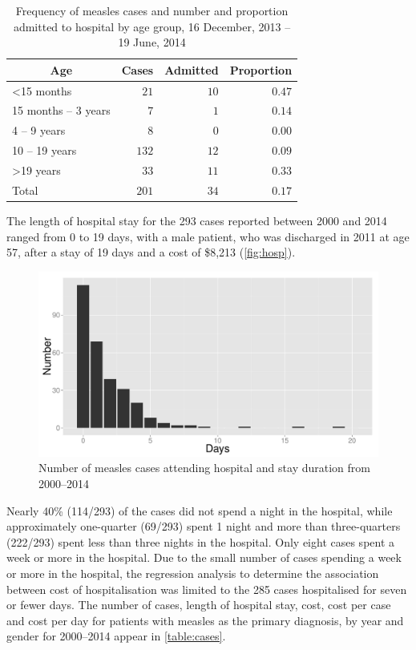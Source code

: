\documentclass{article}
\begin{document}
\begin{table}
\caption{Frequency of measles cases and number and proportion admitted to hospital by age group, 16 December, 2013 -- 19 June, 2014}
\begin{center}
\begin{tabular}{lrrr}
\hline\hline
\multicolumn{1}{c}{Age}&\multicolumn{1}{c}{Cases}&\multicolumn{1}{c}{Admitted}&\multicolumn{1}{c}{Proportion}\tabularnewline
\hline
\textless  15 months&$ 21$&$10$&$0.47$\tabularnewline
15 months – 3 years&$  7$&$ 1$&$0.14$\tabularnewline
4 – 9 years&$  8$&$ 0$&$0.00$\tabularnewline
10 – 19 years&$132$&$12$&$0.09$\tabularnewline
\textgreater  19 years&$ 33$&$11$&$0.33$\tabularnewline
Total&$201$&$34$&$0.17$\tabularnewline
\hline
\end{tabular}\end{center}\label{table:freq}
\end{table}

The length of hospital stay for the 293 cases reported between 2000 and 2014 ranged from 0 to 19 days, with a male patient, who was discharged in 2011 at age 57, after a stay of 19 days and a cost of \$8,213 (\autoref{fig:hosp}).


\begin{figure}
\begin{center}
\includegraphics{draftfinalreport_v2-063}
\end{center}
\caption{Number of measles cases attending hospital and stay duration from 2000--2014}
\label{fig:hosp}
\end{figure}

Nearly 40\% (114/293) of the cases did not spend a night in the hospital, while approximately one-quarter (69/293) spent 1 night and more than three-quarters (222/293) spent less than three nights in the hospital. Only eight cases spent a week or more in the hospital. Due to the small number of cases spending a week or more in the hospital, the regression analysis to determine the association between cost of hospitalisation was limited to the 285 cases hospitalised for seven or fewer days. The number of cases, length of hospital stay, cost, cost per case and cost per day for patients with measles as the primary diagnosis, by year and gender for 2000--2014 appear in \autoref{table:cases}.
\end{document}

